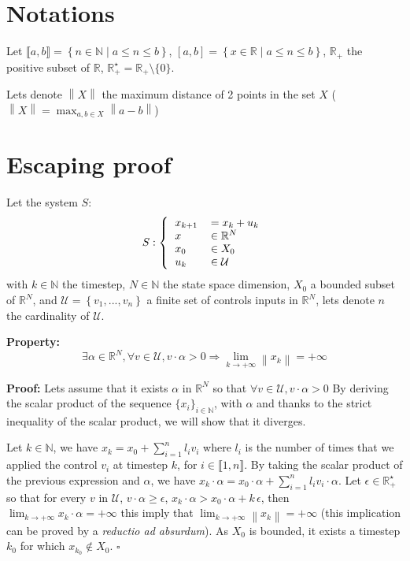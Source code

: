 \documentclass[12pt]{article}
\begin{document}
\newcommand{\argmin}{\operatornamewithlimits{argmin}}

\section*{Notations}

Let $\llbracket a,b \rrbracket = \left \{n \in \mathbb{N} \mid a \leq n \leq b \right \}$, $\left [ a,b \right ]= \left \{x \in \mathbb{R} \mid a \leq n \leq b \right \}$, $\mathbb{R}_+$ the positive subset of $\mathbb{R}$, $\mathbb{R}_+^\star = \mathbb{R}_+ \setminus \{0\}$.

Lets denote $\left \| X \right \|$ the maximum distance of 2 points in the set $X$ ( $\left \| X \right \| = \max_{a,b \in X} \left \| a-b\right \|$)

\section*{Escaping proof}

Let the system $S$:
\begin{equation}
S:\left \{
  \begin{tabular}{ll}
  $x_{k+1}$ &$= x_k + u_k$\\
  $x$ & $\in \mathbb{R}^N$\\
  $x_0$ & $\in X_0$\\
  $u_k$ & $\in \mathcal{U}$
  \end{tabular}
\right.
\end{equation}
with $k \in \mathbb{N}$ the timestep, $N \in \mathbb{N}$ the state space dimension, $X_0$ a bounded subset of $\mathbb{R}^N$, and $\mathcal{U} = \left \{v_1,...,v_n \right \}$ a finite set of controls inputs in $\mathbb{R}^N$, lets denote $n$ the cardinality of $\mathcal{U}$.

\textbf{Property:}
$$
\exists \alpha \in \mathbb{R}^N, \forall v \in \mathcal{U}, v \cdot \alpha > 0
\Rightarrow
\lim_{k \rightarrow + \infty} \left \| x_k \right \| = +\infty
$$

\textbf{Proof:}
Lets assume that it exists $\alpha$ in $\mathbb{R}^N$ so that $\forall v \in \mathcal{U}, v \cdot \alpha > 0$
By deriving the scalar product of the sequence $\{x_i \}_{i \in \mathbb{N}}$, with $\alpha$ and thanks to the strict inequality of the scalar product, we will show that it diverges.

Let $k \in \mathbb{N}$, we have $x_{k} = x_0 + \sum_{i=1}^{n} l_i v_i$ where $l_i$ is the number of times that we applied the control $v_i$ at timestep $k$, for  $i \in \llbracket 1,n \rrbracket$.
By taking the scalar product of the previous expression and $\alpha$, we have $x_k \cdot \alpha = x_0 \cdot \alpha + \sum_{i=1}^{n} l_i v_i \cdot \alpha$. Let  $\epsilon \in \mathbb{R}_+^\star$ so that for every $v$ in $\mathcal{U}$, $v \cdot \alpha \geq \epsilon$, $x_k \cdot \alpha > x_0 \cdot \alpha + k \, \epsilon$, then $\lim_{k \rightarrow + \infty} x_k \cdot \alpha = +\infty$ this imply that $\lim_{k \rightarrow + \infty} \left \| x_k \right \| = +\infty$ (this implication can be proved by a \textit{reductio ad absurdum}). As $X_0$ is bounded, it exists a timestep $k_0$ for which $x_{k_0} \notin X_0$. $\square$
\end{document}
